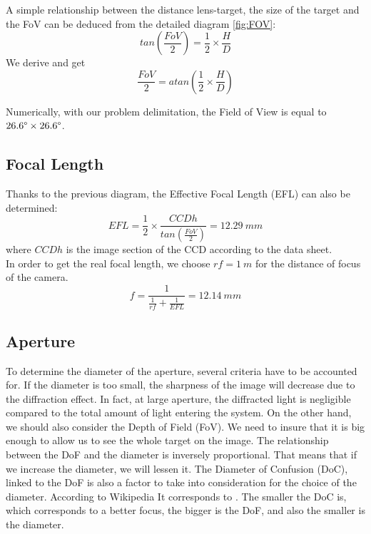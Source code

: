 A simple relationship between the distance lens-target, the size of the target and the FoV can be deduced from the detailed diagram \ref{fig:FOV}: 
\begin{equation*}
tan( \frac{FoV}{2}) = \frac{1}{2} \times \frac{H}{D}
\end{equation*}
We derive and get
\begin{equation*}
 \frac{FoV}{2} = atan(\frac{1}{2} \times \frac{H}{D})
\end{equation*}

Numerically, with our problem delimitation, the Field of View is equal to $26.6\degree \times 26.6\degree$. 

\subsection{Focal Length}
\label{focalLength}
Thanks to the previous diagram, the Effective Focal Length (EFL) can also be determined: 
\begin{equation*}
EFL = \frac{1}{2} \times \frac{CCDh}{tan(\frac{FoV}{2})} = 12.29 \ mm
\end{equation*}
where $CCDh$ is the image section of the CCD according to the data sheet.\\

In order to get the real focal length, we choose $rf = 1 \ m$ for the distance of focus of the camera. 
\begin{equation*}
f = \frac{1}{\frac{1}{rf}+\frac{1}{EFL}} = 12.14 \ mm
\end{equation*}

\subsection{Aperture}
\label{aperture}
To determine the diameter of the aperture, several criteria have to be accounted for. If the diameter is too small, the sharpness of the image will decrease due to the diffraction effect. In fact, at large aperture, the diffracted light is negligible compared to the total amount of light entering the system. On the other hand, we should also consider the Depth of Field (FoV). We need to insure that it is big enough to allow us to see the whole target on the image. The relationship between the DoF and the diameter is inversely proportional. That means that if we increase the diameter, we will lessen it. The Diameter of Confusion (DoC), linked to the DoF is also a factor to take into consideration for the choice of the diameter. According to Wikipedia \cite{wiki:coc} It corresponds to . The smaller the DoC is, which corresponds to a better focus, the bigger is the DoF, and also the smaller is the diameter.

